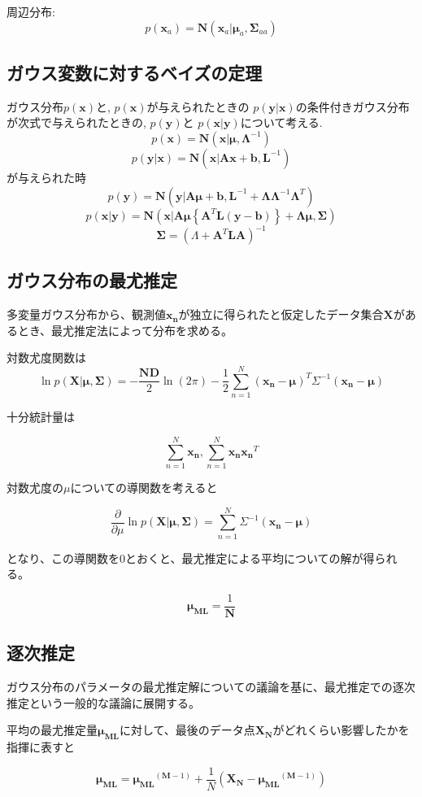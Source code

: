 周辺分布:
$$ p(\bm{x}_{a}) = \bm{N}(\bm{x}_{a}|\bm{\mu}_{a}, \bm{\Sigma}_{aa})  $$


\subsection{ガウス変数に対するベイズの定理}
ガウス分布$p(\bm{x})$と, $p(\bm{x})$が与えられたときの $p(\bm{y|x})$の条件付きガウス分布が次式で与えられたときの, $p(\bm{y})$と $p(\bm{x|y})$について考える.
$$p(\bm{x}) = \bm{N}(\bm{x}|\bm{\mu}, \bm{\Lambda}^{-1})$$
$$p(\bm{y|x}) = \bm{N}(\bm{x}|\bm{Ax}+\bm{b}, \bm{L}^{-1})$$
が与えられた時
$$p(\bm{y}) = \bm{N}(\bm{y}|\bm{A}\bm{\mu}+\bm{b}, \bm{L}^{-1}+\bm{\Lambda}\bm{\Lambda}^{-1}\bm{\Lambda}^{T})$$
$$p(\bm{x|y}) = \bm{N}(\bm{x}|\bm{A}\bm{\mu}\left\{\bm{A}^{T}\bm{L}(\bm{y}-\bm{b})\right\} + \bm{\Lambda}\bm{\mu}, \bm{\Sigma})$$
$$\bm{\Sigma} = ({\Lambda}+\bm{A}^{T}\bm{L}\bm{A})^{-1}$$

\subsection{ガウス分布の最尤推定}
多変量ガウス分布から、観測値$\bm{x_n}$が独立に得られたと仮定したデータ集合$\bm{X}$があるとき、最尤推定法によって分布を求める。

対数尤度関数は
$$ \ln p(\bm{X}|\bm{\mu}, \bm{\Sigma}) =  -\frac{\bm{ND}}{2}\ln(2\pi)-\frac{1}{2}\sum_{n=1}^N(\bm{x_n}-\bm{\mu})^{T}\Sigma ^{-1}(\bm{x_n}-\bm{\mu})$$

十分統計量は

$$ \sum_{n=1}^N\bm{x_n},  \sum_{n=1}^N\bm{x_n}\bm{x_n}^{T} $$

対数尤度の$\mu$についての導関数を考えると

$$ \frac{\partial}{\partial \mu}\ln p(\bm{X}|\bm{\mu}, \bm{\Sigma}) = \sum_{n=1}^N\Sigma ^{-1}(\bm{x_n}-\bm{\mu})$$

となり、この導関数を0とおくと、最尤推定による平均についての解が得られる。

$$ \bm{\mu_{ML}} = \frac{1}{\bm{N}}$$
\subsection{逐次推定}
ガウス分布のパラメータの最尤推定解についての議論を基に、最尤推定での逐次推定という一般的な議論に展開する。

平均の最尤推定量$\bm{\mu_{ML}} $に対して、最後のデータ点$\bm{X_N}$がどれくらい影響したかを指揮に表すと

$$ \bm{\mu_{ML}} = \bm{\mu_{ML}}^{(\bm{M}-1)} + \frac{1}{N}(\bm{X_N}-\bm{\mu_{ML}}^{(\bm{M}-1)})$$

